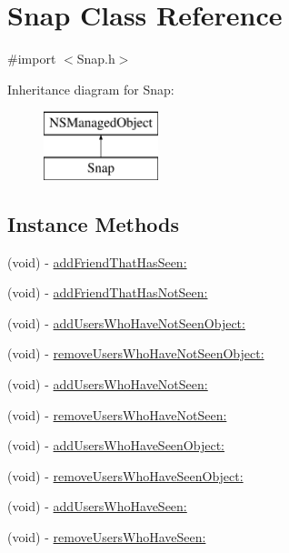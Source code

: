 \hypertarget{interface_snap}{}\section{Snap Class Reference}
\label{interface_snap}


{\ttfamily \#import $<$Snap.\+h$>$}

Inheritance diagram for Snap\+:\begin{figure}[H]
\begin{center}
\leavevmode
\includegraphics[height=2.000000cm]{interface_snap}
\end{center}
\end{figure}
\subsection*{Instance Methods}
\begin{DoxyCompactItemize}
\item 
(void) -\/ \hyperlink{interface_snap_a87bfdb9a2e8907d7d269c594f139ef76}{add\+Friend\+That\+Has\+Seen\+:}
\item 
(void) -\/ \hyperlink{interface_snap_a647182ddde9d7db97df0bc5cda432d88}{add\+Friend\+That\+Has\+Not\+Seen\+:}
\item 
(void) -\/ \hyperlink{interface_snap_a857bdb8ecd8f9e24445e64fd8279a126}{add\+Users\+Who\+Have\+Not\+Seen\+Object\+:}
\item 
(void) -\/ \hyperlink{interface_snap_a05c43e998f06072a2768e7db4b34a04d}{remove\+Users\+Who\+Have\+Not\+Seen\+Object\+:}
\item 
(void) -\/ \hyperlink{interface_snap_a76ddef740df9f189a1b411c93efdd593}{add\+Users\+Who\+Have\+Not\+Seen\+:}
\item 
(void) -\/ \hyperlink{interface_snap_aab479d17ca768b4132fbb78faded55fb}{remove\+Users\+Who\+Have\+Not\+Seen\+:}
\item 
(void) -\/ \hyperlink{interface_snap_a6841f827b13abc833d3ec7c40c522a1b}{add\+Users\+Who\+Have\+Seen\+Object\+:}
\item 
(void) -\/ \hyperlink{interface_snap_ab97c4c0a0f132f6f420ac3127dcd9142}{remove\+Users\+Who\+Have\+Seen\+Object\+:}
\item 
(void) -\/ \hyperlink{interface_snap_a855a2e43572cd214251230b2a0612421}{add\+Users\+Who\+Have\+Seen\+:}
\item 
(void) -\/ \hyperlink{interface_snap_af4fa1e8b7b4cdd429c312312704b61ab}{remove\+Users\+Who\+Have\+Seen\+:}
\end{DoxyCompactItemize}
